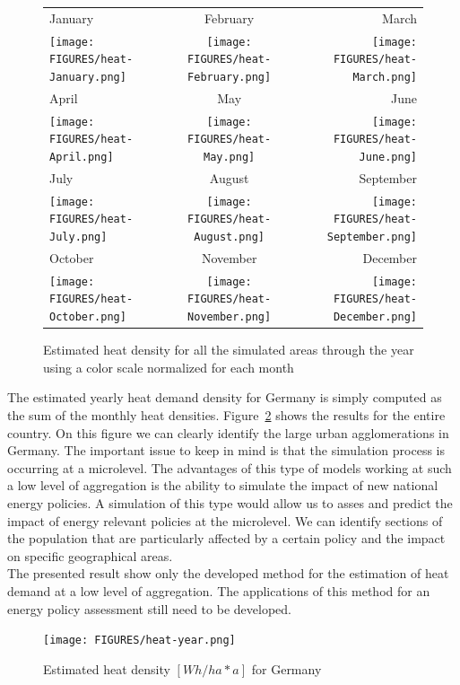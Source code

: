 \documentclass[runningheads,a4paper]{llncs}
\begin{document}
\begin{figure}
\centering
\begin{tabular}{lcr}
    January & February & March \\
\texttt{[image: FIGURES/heat-January.png]}&
\texttt{[image: FIGURES/heat-February.png]}&
\texttt{[image: FIGURES/heat-March.png]}\\
    April & May & June \\
\texttt{[image: FIGURES/heat-April.png]}&
\texttt{[image: FIGURES/heat-May.png]}&
\texttt{[image: FIGURES/heat-June.png]}\\
    July & August & September \\
\texttt{[image: FIGURES/heat-July.png]}&
\texttt{[image: FIGURES/heat-August.png]}&
\texttt{[image: FIGURES/heat-September.png]}\\
    October & November & December \\
\texttt{[image: FIGURES/heat-October.png]}&
\texttt{[image: FIGURES/heat-November.png]}&
\texttt{[image: FIGURES/heat-December.png]}\\
\end{tabular}
\caption{Estimated heat density for all the simulated areas through the
year using a color scale normalized for each month}\label{fig:mapHeatdensity}
\end{figure}

The estimated yearly heat demand density for Germany is simply computed as the sum of
the monthly heat densities. Figure~\ref{fig:mapYear} shows the results for the
entire country. On this figure we can clearly identify the large urban
agglomerations in Germany. The important issue to keep in mind is that the
simulation process is occurring at a microlevel. The advantages of this type of
models working at such a low level of aggregation is the ability to simulate
the impact of new national energy policies. A simulation of this type would
allow us to asses and predict the impact of energy relevant policies at the
microlevel. We can identify sections of the population that are particularly
affected by a certain policy and the impact on specific geographical areas.
\\

The presented result show only the developed method for the estimation of heat
demand at a low level of aggregation. The applications of this method for an
energy policy assessment still need to be developed.
\\

\begin{figure}
\centering
\texttt{[image: FIGURES/heat-year.png]}
\caption{Estimated heat density $[Wh/ha*a]$ for Germany}\label{fig:mapYear}
\end{figure}
\end{document}
